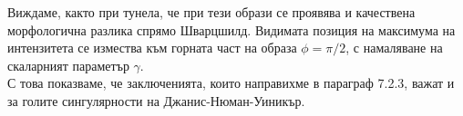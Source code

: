 Виждаме, както при тунела, че при тези образи се проявява и качествена морфологична разлика спрямо Шварцшилд. Видимата позиция на максимума на интензитета се измества към горната част на образа $\phi = \pi / 2$, с намаляване на скаларният параметър $\gamma$.\\

С това показваме, че заключенията, които направихме в параграф 7.2.3, важат и за голите сингулярности на Джанис-Нюман-Уиникър.